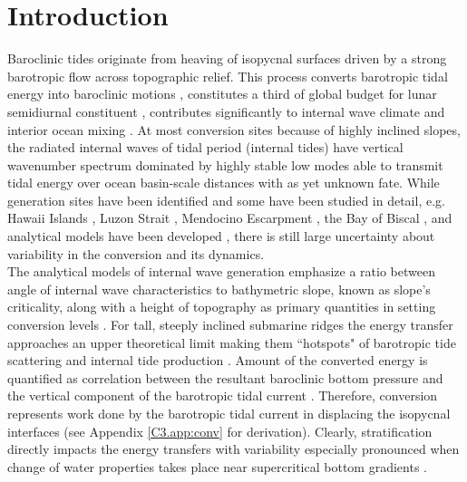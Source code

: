 \documentclass[12pt]{article}
\begin{document}
\section{Introduction}
Baroclinic tides originate from heaving of isopycnal surfaces driven by a strong 
barotropic flow across topographic relief. This process converts barotropic tidal 
energy into baroclinic motions \citep{hendershott1981long}, constitutes a 
third of global budget for lunar semidiurnal constituent \citep{egbert2000significant, 
munk1997once}, contributes significantly to internal wave climate \citep{wunsch1975deep} and 
interior ocean mixing \citep{wunsch2004vertical}. At most conversion sites because of highly 
inclined slopes, the radiated 
internal waves of tidal period (internal tides) have vertical wavenumber spectrum dominated by 
highly stable low modes \citep{st2002role} able to transmit tidal energy over ocean basin-scale 
distances \citep{zhao2016global} with as yet unknown fate. While generation sites have been 
identified 
\citep{morozov1995semidiurnal, simmons2004internal, arbic2010concurrent} and some have been 
studied in detail, e.g. Hawaii Islands \citep{rudnick2003tides}, Luzon Strait 
\citep{alford2015formation}, Mendocino Escarpment \citep{althaus2003internal}, 
the Bay of Biscal 
\citep{gerkema2004internal}, and analytical models have been developed \citep{garrett2007internal}, 
there is still large uncertainty about variability in the conversion and its dynamics.\\

The analytical models of internal wave generation emphasize a ratio between angle of internal wave 
characteristics to bathymetric slope, known as slope's criticality, \citep{sutherland2010internal, 
garrett2007internal} along with a height of topography as primary quantities in setting conversion 
levels \citep{llewellyn2003tidal, petrelis2006tidal}. For tall, steeply inclined submarine ridges 
the energy transfer approaches an upper theoretical limit \citep{petrelis2006tidal, 
st2003generation} making them ``hotspots" of barotropic tide scattering and internal tide 
production \citep{morozov1995semidiurnal, egbert2000significant}. Amount of the converted energy is 
quantified as correlation between the resultant baroclinic bottom pressure and the 
vertical component of the barotropic tidal current \citep{kurapov2003m, simmons2004internal}. 
Therefore, conversion  
represents work done by the 
barotropic tidal current in displacing the isopycnal interfaces (see Appendix \ref{C3.app:conv} for 
derivation). Clearly, stratification  
directly 
impacts the energy transfers \citep{holloway1999internal} with variability especially 
pronounced when change of water properties takes place near supercritical bottom gradients 
\citep{gerkema2004internal}.\\
\end{document}
